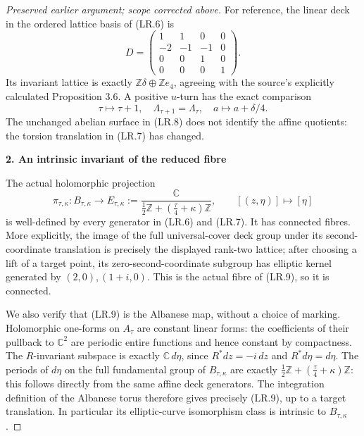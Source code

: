 \begin{proof}[Preserved earlier argument; scope corrected above]
For reference, the linear deck in the ordered lattice basis of
(LR.6) is
\[
 D=\begin{pmatrix}
 1&1&0&0\\-2&-1&-1&0\\0&0&1&0\\0&0&0&1
 \end{pmatrix}.
\]
Its invariant lattice is exactly
\(\mathbb Z\delta\oplus\mathbb Z e_4\), agreeing with the
source's explicitly calculated Proposition 3.6.
A positive \(u\)-turn has the exact comparison
\[
 \tau\longmapsto\tau+1,
 \quad \Lambda_{\tau+1}=\Lambda_\tau,
 \quad a\longmapsto a+\delta/4.                      \tag{LR.8}
\]
The unchanged abelian surface in (LR.8) does not identify the affine
quotients: the torsion translation in (LR.7) has changed.

\par

\medskip\noindent\textbf{2. An intrinsic invariant of the reduced fibre}

\par\nobreak

The actual holomorphic projection
\[
 \pi_{\tau,\kappa}:B_{\tau,\kappa}\longrightarrow
 E_{\tau,\kappa}:=
 \frac{\mathbb C}{\frac12\mathbb Z+
                       (\frac\tau4+\kappa)\mathbb Z},
 \qquad [(z,\eta)]\longmapsto[\eta]                  \tag{LR.9}
\]
is well-defined by every generator in (LR.6) and (LR.7).
It has connected fibres. More explicitly, the image of the full
universal-cover deck group under its second-coordinate translation
is precisely the displayed rank-two lattice; after choosing a lift
of a target point, its zero-second-coordinate subgroup has elliptic
kernel generated by \((2,0),(1+i,0)\). This is the actual fibre of
(LR.9), so it is connected.

We also verify that (LR.9) is the Albanese map, without a choice of
marking. Holomorphic one-forms on \(A_\tau\) are constant linear
forms: the coefficients of their pullback to \(\mathbb C^2\) are
periodic entire functions and hence constant by compactness. The
\(R\)-invariant subspace is exactly \(\mathbb C\,d\eta\), since
\(R^*dz=-i\,dz\) and \(R^*d\eta=d\eta\). The periods of
\(d\eta\) on the full fundamental group of \(B_{\tau,\kappa}\)
are exactly \(\frac12\mathbb Z+(\frac\tau4+\kappa)\mathbb Z\):
this follows directly from the same affine deck generators. The
integration definition of the Albanese torus therefore gives
precisely (LR.9), up to a target translation. In particular its
elliptic-curve isomorphism class is intrinsic to \(B_{\tau,\kappa}\).


\end{proof}
